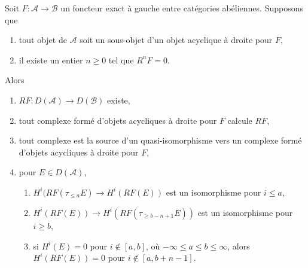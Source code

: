 \begin{lemma}
\label{lemma-unbounded-right-derived}
Soit $F : \mathcal{A} \to \mathcal{B}$ un foncteur exact à gauche entre
catégories abéliennes. Supposons que
\begin{enumerate}
\item tout objet de $\mathcal{A}$ soit un sous-objet d'un objet acyclique à
droite pour $F$,
\item il existe un entier $n \geq 0$ tel que $R^nF = 0$.
\end{enumerate}
Alors
\begin{enumerate}
\item $RF : D(\mathcal{A}) \to D(\mathcal{B})$ existe,
\item tout complexe formé d'objets acycliques à droite pour $F$ calcule $RF$,
\item tout complexe est la source d'un quasi-isomorphisme vers un complexe
formé d'objets acycliques à droite pour $F$,
\item pour $E \in D(\mathcal{A})$,
\begin{enumerate}
\item $H^i(RF(\tau_{\leq a}E) \to H^i(RF(E))$ est un isomorphisme
pour $i \leq a$,
\item $H^i(RF(E)) \to H^i(RF(\tau_{\geq b - n + 1}E))$ est un isomorphisme
pour $i \geq b$,
\item si $H^i(E) = 0$ pour $i \not \in [a, b]$, où
$-\infty \leq a \leq b \leq \infty$, alors $H^i(RF(E)) = 0$
pour $i \not \in [a, b + n - 1]$.
\end{enumerate}
\end{enumerate}
\end{lemma}

